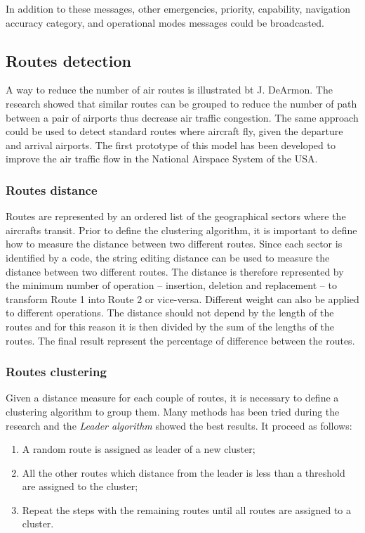 \documentclass{vldb}
\begin{document}
In addition to these messages, other emergencies, priority, capability,
navigation accuracy category, and operational modes messages could be
broadcasted.

\subsection{Routes detection}

A way to reduce the number of air routes is illustrated bt J. DeArmon.
The research showed that similar routes can be grouped to reduce the
number of path between a pair of airports thus decrease air traffic 
congestion\cite{routeclustering}. The same approach could be used to detect
standard routes where aircraft fly, given the departure and arrival airports.
The first prototype of this model has been developed to improve the air traffic
flow in the National Airspace System of the USA.

\subsubsection{Routes distance}

Routes are represented by an ordered list of the geographical sectors where the
aircrafts transit. Prior to define the clustering algorithm, it is important to
define how to measure the distance between two different routes. Since each
sector is identified by a code, the string editing distance can be used to
measure the distance between two different routes. The distance is therefore
represented by the minimum number of operation -- insertion, deletion and
replacement -- to transform Route 1 into Route 2 or vice-versa. Different weight
can also be applied to different operations. The distance should not depend by
the length of the routes and for this reason it is then divided by the sum of
the lengths of the routes. The final result represent the percentage of
difference between the routes.

\subsubsection{Routes clustering}

Given a distance measure for each couple of routes, it is necessary to define a
clustering algorithm to group them. Many methods has been tried during the
research and the \textit{Leader algorithm} showed the best results. It proceed
as follows:

\begin{enumerate}
  \item A random route is assigned as leader of a new cluster;
  \item All the other routes which distance from the leader is less than a
  threshold are assigned to the cluster;
  \item Repeat the steps with the remaining routes until all routes are assigned
  to a cluster.
\end{enumerate}
\end{document}
